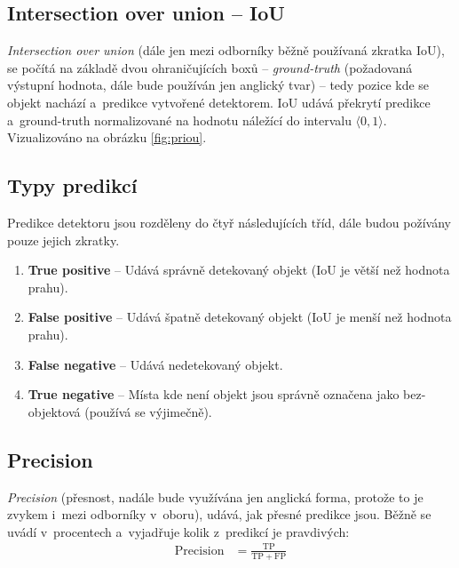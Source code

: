 \subsection*{Intersection over union -- IoU}
\emph{Intersection over union} (dále jen mezi odborníky běžně používaná zkratka IoU), se počítá na základě dvou ohraničujících boxů -- \emph{ground-truth} (požadovaná výstupní hodnota, dále bude používán jen anglický tvar) -- tedy pozice kde se objekt nachází a~predikce vytvořené detektorem. IoU udává překrytí predikce a~ground-truth normalizované na hodnotu náležící do intervalu $\langle0,1\rangle$. Vizualizováno na obrázku \ref{fig:priou}.

\subsection*{Typy predikcí}
Predikce detektoru jsou rozděleny do čtyř následujících tříd, dále budou požívány pouze jejich zkratky.

\begin{enumerate}
    \item \textbf{True positive} -- Udává správně detekovaný objekt (IoU je větší než hodnota prahu).
    \item \textbf{False positive} -- Udává špatně detekovaný objekt (IoU je menší než hodnota prahu).
    \item \textbf{False negative} -- Udává nedetekovaný objekt.
    \item \textbf{True negative} -- Místa kde není objekt jsou správně označena jako bez-objektová (používá se výjimečně).
\end{enumerate}


\subsection*{Precision}
\emph{Precision} (přesnost, nadále bude využívána jen anglická forma, protože to je zvykem i~mezi odborníky v~oboru), udává, jak přesné predikce jsou. Běžně se uvádí v~procentech a~vyjadřuje kolik z~predikcí je pravdivých:
\begin{align}
    \label{eq:precision}
    \mathrm{Precision} &= \frac{\mathrm{TP}}{\mathrm{TP} + \mathrm{FP}}
\end{align}
